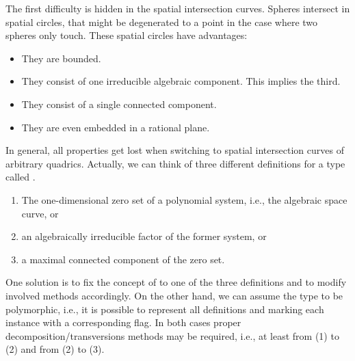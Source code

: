 The first difficulty is hidden in the spatial intersection curves.
Spheres intersect in spatial circles, that might be degenerated
to a point in the case where two spheres only touch. These spatial circles
have advantages: 
\begin{itemize}
\item They are bounded. 
\item They consist of one irreducible algebraic component. This implies the 
third.
\item They consist of a single connected component.
\item They are even embedded in a rational plane.
\end{itemize}
In general, all properties get lost when switching to spatial 
intersection curves of arbitrary quadrics.
Actually, we can think of three different definitions for
a type called .
\begin{enumerate}
\item The one-dimensional zero set of a polynomial
system, i.e., the algebraic space curve, or 
\item an algebraically irreducible factor of the former system, or 
\item a maximal connected component
of the zero set.
\end{enumerate}
One solution is to fix the concept of  to one of the
three definitions and to modify involved methods accordingly.
On the other hand, we can assume the type to be 
polymorphic, i.e., it is possible
to represent all definitions and marking each instance with a corresponding
flag. In both cases proper decomposition/transversions
methods may be required, i.e., at least from (1) to (2) and from (2) to (3).


